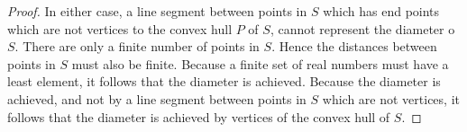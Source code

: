 \documentclass[12pt]{article}
\theoremstyle{definition}
\begin{document}
\begin{proof}
In either case, a line segment between points in $S$ which has end points which are not vertices to the convex hull $P$ of $S$, cannot represent the diameter o $S$. There are only a finite number of points in $S$. Hence the distances between points in $S$ must also be finite. Because a finite set of real numbers must have a least element, it follows that the diameter is achieved. Because the diameter is achieved, and not by a line segment between points in $S$ which are not vertices, it follows that the diameter is achieved by vertices of the convex hull of $S$. 
\end{proof} 
\end{document}
